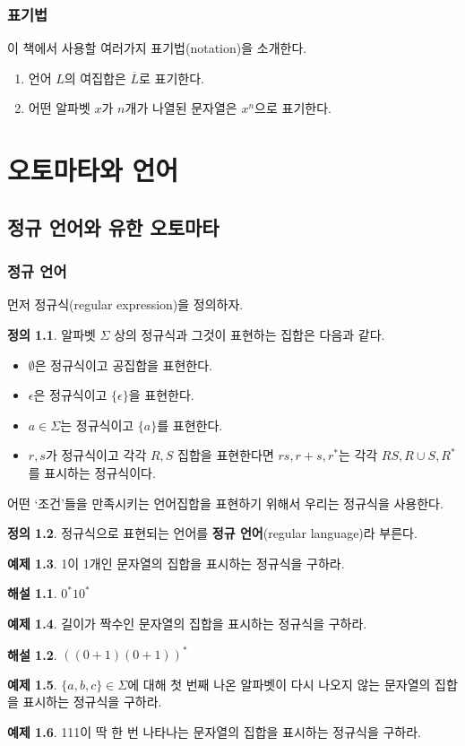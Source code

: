 \documentclass[b5paper, 11pt]{book}
\theoremstyle{definition}
\newtheorem{defn}{정의}[chapter]
\newtheorem{ex}[defn]{예제}
\newtheorem*{ans*}{해설}
\begin{document}
\section{표기법}
이 책에서 사용할 여러가지 표기법(notation)을 소개한다.
\begin{enumerate}
    \item 언어 $L$의 여집합은 $\overline{L}$로 표기한다.
    \item 어떤 알파벳 $x$가 $n$개가 나열된 문자열은 $x^n$으로 표기한다.
\end{enumerate}
\part{오토마타와 언어}
\chapter{정규 언어와 유한 오토마타} 
\section{정규 언어}
먼저 정규식(regular expression)을 정의하자.
\begin{defn}\label{regldefn}
    알파벳 $\Sigma$ 상의 정규식과 그것이 표현하는 집합은 다음과 같다.
\begin{itemize}
    \item $\emptyset$은 정규식이고 공집합을 표현한다.
    \item $\epsilon$은 정규식이고 $\{\epsilon\}$을 표현한다.
    \item $a \in \Sigma$는 정규식이고 $\{a\}$를 표현한다.
    \item $r, s$가 정규식이고 각각 $R, S$ 집합을 표현한다면 $rs, r+s, r^*$는 각각 $RS, R\cup S, R^* $ 를 표시하는 정규식이다. 
\end{itemize}
\end{defn}
어떤 `조건'들을 만족시키는 언어집합을 표현하기 위해서 우리는 정규식을 사용한다.
\begin{defn}
정규식으로 표현되는 언어를 \textbf{정규 언어}(regular language)라 부른다.
\end{defn}
\begin{ex}
    1이 1개인 문자열의 집합을 표시하는 정규식을 구하라.
\end{ex}
\begin{ans*}
    $0^* 1 0^*$
\end{ans*}
\begin{ex}
  길이가 짝수인 문자열의 집합을 표시하는 정규식을 구하라.
\end{ex} 
\begin{ans*}
    $((0+1)(0+1))^*$
\end{ans*}
\begin{ex}
$\{a, b, c\} \in \Sigma$에 대해 첫 번째 나온 알파벳이 다시 나오지 않는 문자열의 집합을 표시하는 정규식을 구하라.
\end{ex}
\begin{ex}
111이 딱 한 번 나타나는 문자열의 집합을 표시하는 정규식을 구하라.
\end{ex}
\end{document}
